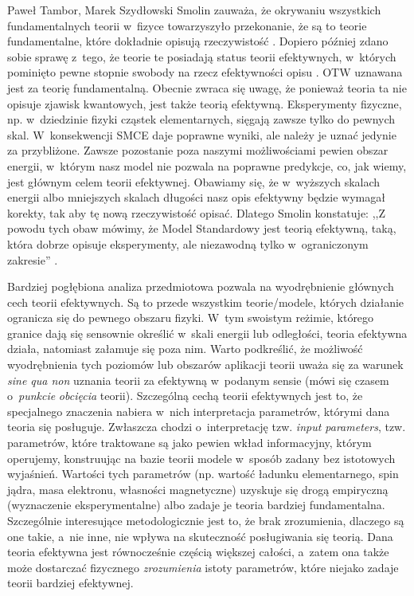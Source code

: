 \begin{artplenv2auth}{Paweł Tambor, Marek Szydłowski}
Smolin zauważa, że okrywaniu wszystkich fundamentalnych teorii w~fizyce towarzyszyło przekonanie, że są to teorie fundamentalne, które dokładnie opisują rzeczywistość
\parencite[][s.~163–167]{smolin_czas_2015}. %
 Dopiero później zdano sobie sprawę z~tego, że teorie te posiadają status teorii efektywnych, w~których pominięto pewne stopnie swobody na rzecz efektywności opisu 
\parencite[][]{wilson_non-reductive_2010}. %
 OTW uznawana jest za teorię fundamentalną. Obecnie zwraca się uwagę, że ponieważ teoria ta nie opisuje zjawisk kwantowych, jest także teorią efektywną. Eksperymenty fizyczne, np. w~dziedzinie fizyki cząstek elementarnych, sięgają zawsze tylko do pewnych skal. W~konsekwencji SMCE daje poprawne wyniki, ale należy je uznać jedynie za przybliżone. Zawsze pozostanie poza naszymi możliwościami pewien obszar energii, w~którym nasz model nie pozwala na poprawne predykcje, co, jak wiemy, jest głównym celem teorii efektywnej. Obawiamy się, że w~wyższych skalach energii albo mniejszych skalach długości nasz opis efektywny będzie wymagał korekty, tak aby tę nową rzeczywistość opisać. Dlatego Smolin konstatuje: ,,Z powodu tych obaw mówimy, że Model Standardowy jest teorią efektywną, taką, która dobrze opisuje eksperymenty, ale niezawodną tylko w~ograniczonym zakresie'' 
\parencite[][s.~164]{smolin_czas_2015}.%


Bardziej pogłębiona analiza przedmiotowa pozwala na wyodrębnienie głównych cech teorii efektywnych. Są to przede wszystkim teorie/modele, których działanie ogranicza się do pewnego obszaru fizyki. W~tym swoistym reżimie, którego granice dają się sensownie określić w~skali energii lub odległości, teoria efektywna działa, natomiast załamuje się poza nim. Warto podkreślić, że możliwość wyodrębnienia tych poziomów lub obszarów aplikacji teorii uważa się za warunek \textit{sine qua non} uznania teorii za efektywną w~podanym sensie (mówi się czasem o~\textit{punkcie} \textit{obcięcia} teorii). Szczególną cechą teorii efektywnych jest to, że specjalnego znaczenia nabiera w~nich interpretacja parametrów, którymi dana teoria się posługuje. Zwłaszcza chodzi o~interpretację tzw. \textit{input parameters}, tzw. parametrów, które traktowane są jako pewien wkład informacyjny, którym operujemy, konstruując na bazie teorii modele w~sposób zadany bez istotowych wyjaśnień. Wartości tych parametrów (np. wartość ładunku elementarnego, spin jądra, masa elektronu, własności magnetyczne) uzyskuje się drogą empiryczną (wyznaczenie eksperymentalne) albo zadaje je teoria bardziej fundamentalna. Szczególnie interesujące metodologicznie jest to, że brak zrozumienia, dlaczego są one takie, a~nie inne, nie wpływa na skuteczność posługiwania się teorią. Dana teoria efektywna jest równocześnie częścią większej całości, a~zatem ona także może dostarczać fizycznego \textit{zrozumienia} istoty parametrów, które niejako zadaje teorii bardziej efektywnej.


\end{artplenv2auth}
